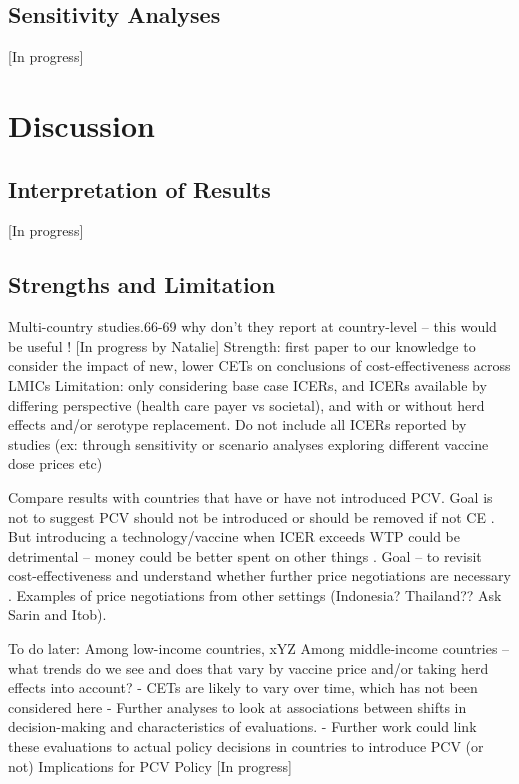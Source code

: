 \documentclass[12pt]{article}
\begin{document}
\subsection{Sensitivity Analyses}
[In progress]


\section{Discussion}
\subsection{Interpretation of Results}
[In progress]

\subsection{Strengths and Limitation}
Multi-country studies.66-69 why don't they report at country-level – this would be useful !
[In progress by Natalie]
Strength: first paper to our knowledge to consider the impact of new, lower CETs on conclusions of cost-effectiveness across LMICs
Limitation: only considering base case ICERs, and ICERs available by differing perspective (health care payer vs societal), and with or without herd effects and/or serotype replacement.
Do not include all ICERs reported by studies (ex: through sensitivity or scenario analyses exploring different vaccine dose prices etc)

Compare results with countries that have or have not introduced PCV. Goal is not to suggest PCV should not be introduced or should be removed if not CE . But introducing a technology/vaccine when ICER exceeds WTP could be detrimental – money could be better spent on other things .
Goal – to revisit cost-effectiveness and understand whether further price negotiations are necessary . Examples of price negotiations from other settings (Indonesia? Thailand?? Ask Sarin and Itob). 

To do later:
Among low-income countries, xYZ 
Among middle-income countries – what trends do we see and does that vary by vaccine price and/or taking herd effects into account?
-	CETs are likely to vary over time, which has not been considered here
-	Further analyses to look at associations between shifts in decision-making and characteristics of evaluations.
-	Further work could link these evaluations to actual policy decisions in countries to introduce PCV (or not)
Implications for PCV Policy
[In progress]





\clearpage
\newrefcontext[sorting=nyt]
\printbibliography
\end{document}
